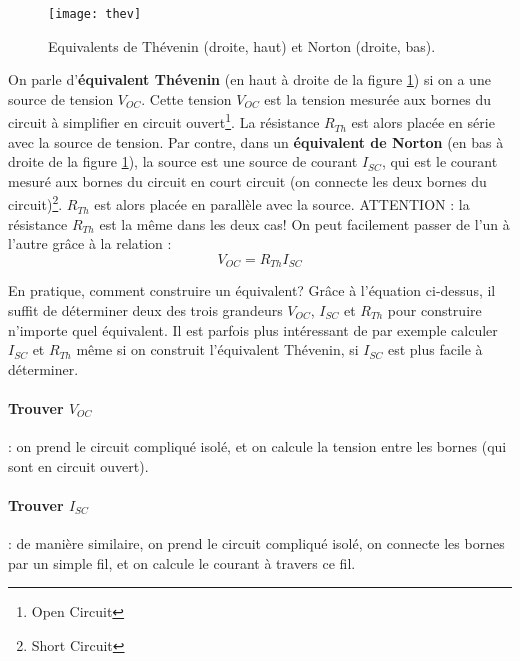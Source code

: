 \begin{figure}[h]
	\centering
    \texttt{[image: thev]}
    \caption{Equivalents de Thévenin (droite, haut) et Norton (droite, bas).}
     \label{thev}
\end{figure}

On parle d'\textbf{équivalent Thévenin} (en haut à droite de la figure \ref{thev}) si on a une source de tension $V_{OC}$. Cette tension $V_{OC}$ est la tension mesurée aux bornes du circuit à simplifier en circuit ouvert\footnote{\og Open Circuit\fg}. La résistance $R_{Th}$ est alors placée en série avec la source de tension. Par contre, dans un \textbf{équivalent de Norton} (en bas à droite de la figure \ref{thev}), la source est une source de courant $I_{SC}$, qui est le courant mesuré aux bornes du circuit en court circuit (on connecte les deux bornes du circuit)\footnote{\og Short Circuit\fg}. $R_{Th}$ est alors placée en parallèle avec la source. ATTENTION : la résistance $R_{Th}$ est la même dans les deux cas! On peut facilement passer de l'un à l'autre grâce à la relation :
\begin{equation}
V_{OC} = R_{Th}I_{SC}
\end{equation}

En pratique, comment construire un équivalent? Grâce à l'équation ci-dessus, il suffit de déterminer deux des trois grandeurs $V_{OC}$, $I_{SC}$ et $R_{Th}$ pour construire n'importe quel équivalent. Il est parfois plus intéressant de par exemple calculer $I_{SC}$ et $R_{Th}$ même si on construit l'équivalent Thévenin, si $I_{SC}$ est plus facile à déterminer.

\paragraph{Trouver $V_{OC}$} : on prend le circuit compliqué isolé, et on calcule la tension entre les bornes (qui sont en circuit ouvert).

\paragraph{Trouver $I_{SC}$} : de manière similaire, on prend le circuit compliqué isolé, on connecte les bornes par un simple fil, et on calcule le courant à travers ce fil.

